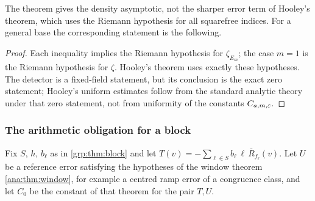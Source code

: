 The theorem gives the density asymptotic, not the sharper error term of
Hooley's theorem, which uses the Riemann hypothesis for all squarefree
indices. For a general base the corresponding statement is the following.


\begin{proof}
Each inequality implies the Riemann hypothesis for $\zeta_{E_m}$; the case
$m=1$ is the Riemann hypothesis for $\zeta$. Hooley's theorem
\cite{Hooley1967Artin,Moree2012Artin} uses exactly these hypotheses. The
detector is a fixed-field statement, but its conclusion is the exact zero
statement; Hooley's uniform estimates follow from the standard analytic theory
under that zero statement, not from uniformity of the constants
$C_{a,m,\varepsilon}$.
\end{proof}

\subsubsection{The arithmetic obligation for a block}
Fix $S$, $h$, $b_\ell$ as in \cref{grp:thm:block} and let
$T(v)=-\sum_{\ell\in S}b_\ell\,\ell\,\overline R_{f_\ell}(v)$. Let $U$ be a
reference error satisfying the hypotheses of the window theorem
\cref{ana:thm:window}, for example a centred ramp error of a congruence class,
and let $C_0$ be the constant of that theorem for the pair $T,U$.


